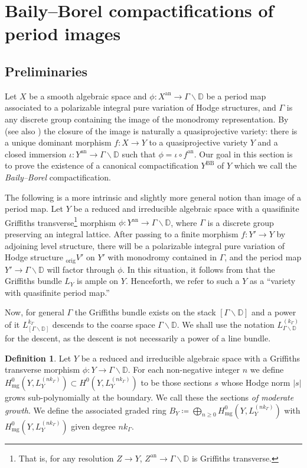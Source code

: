 \documentclass{amsart}
\newcommand{\bs}{\backslash}
\newcommand{\an}{\operatorname{an}}
\theoremstyle{definition}
\newtheorem{defn}[theorem]{Definition}
\theoremstyle{remark}
\def\bD{\mathbb{D}}
\def\an{\mathrm{an}}
\def\orig{\mathrm{orig}}
\def\BB{\mathrm{BB}}
\def\bdd{\mathrm{mg}}
\numberwithin{equation}{section}
\begin{document}
\section{Baily--Borel compactifications of period images}

\subsection{Preliminaries}

Let $X$ be a smooth algebraic space and $\phi:X^{\an}\to\Gamma\backslash \bD$ be a period map associated to a polarizable integral pure variation of Hodge structures, and $\Gamma$ is any discrete group containing the image of the monodromy representation. By \cite[Theorem 1.1]{BBT23} (see also \cite[Corollary 2.11]{bbtmixed}) the closure of the image is naturally a quasiprojective variety: there is a unique dominant morphism $f:X\to Y$ to a quasiprojective variety $Y$ and a closed immersion $\iota:Y^{\an}\to\Gamma\backslash \bD$ such that $\phi=\iota\circ f^{\an}$. Our goal in this section is to prove the existence of a canonical compactification $Y^{\BB}$ of $Y$ which we call the \textit{Baily--Borel} compactification.

The following is a more intrinsic and slightly more general notion than image of a period map. Let $Y$ be a reduced and irreducible algebraic space with a quasifinite Griffiths transverse\footnote{That is, for any resolution $Z\to Y$, $Z^\an\to \Gamma\backslash\bD$ is Griffiths transverse.} morphism $\phi:Y^\an\to \Gamma\backslash \bD$, where $\Gamma$ is a discrete group preserving an integral lattice.  After passing to a finite morphism $f:Y'\to Y$ by adjoining level structure, there will be a polarizable integral pure variation of Hodge structure $_\orig V'$ on $Y'$ with monodromy contained in $\Gamma$, and the period map $Y'\to \Gamma\backslash \bD$ will factor through $\phi$.  In this situation, it follows from \cite{BBT23} that the Griffiths bundle $L_Y$ is ample on $Y$.  Henceforth, we refer to such a $Y$ as a  ``variety with quasifinite period map.''

Now, for general $\Gamma$ the Griffiths bundle exists on the stack $[\Gamma\bs\bD]$ and a power of it $L_{[\Gamma\bs\bD]}^{k_\Gamma}$ descends to the coarse space $\Gamma\bs\bD$. We shall use the notation $L_{\Gamma\backslash\bD}^{(k_\Gamma)}$ for the descent, as the descent is not necessarily a power of a line bundle.

\begin{defn}
Let $Y$ be a reduced and irreducible algebraic space with a Griffiths transverse morphism $\phi:Y\to \Gamma\backslash \bD$. For each non-negative integer $n$ we define $H^0_{\bdd}(Y,L_Y^{(nk_\Gamma)})\subset H^0(Y,L_Y^{(nk_\Gamma)})$ to be those sections $s$ whose Hodge norm $|s|$ grows sub-polynomially at the boundary.  We call these the sections \textit{of moderate growth}. We define the associated graded ring
$B_Y\coloneqq  \bigoplus_{n\geq 0}H^0_{\bdd}(Y,L_Y^{(nk_\Gamma)})$ with $H^0_{\bdd}(Y,L_Y^{(nk_\Gamma)})$ given degree $nk_\Gamma$.
\end{defn}
\end{document}
